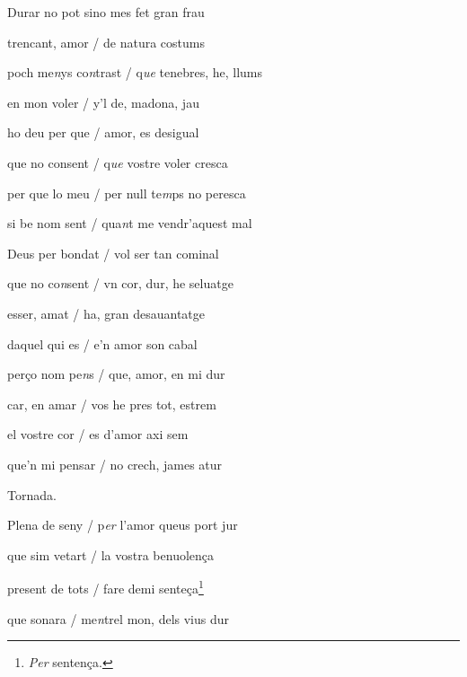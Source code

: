 \documentclass[12pt]{article}
\begin{document}
\begin{estrofa}

 Durar no pot sino mes fet gran frau

 trencant, amor / de natura costums

 poch me\textit{n}ys co\textit{n}trast / q\textit{ue} tenebres, he, llums

 en mon voler / y'l de, madona, jau

 ho deu per que / amor, es desigual

 que no consent / q\textit{ue} vostre voler cresca

 per que lo meu / per null te\textit{m}ps no peresca

 si be nom sent / qua\textit{n}t me vendr'aquest mal

\end{estrofa}



\begin{estrofa}

 Deus per bondat / vol ser tan cominal

 que no co\textit{n}sent / vn cor, dur, he seluatge

 esser, amat / ha, gran desauantatge

 daquel qui es / e'n amor son cabal

 per\c{c}o nom pe\textit{n}s / que, amor, en mi dur

 car, en amar / vos he pres tot, estrem

 el vostre cor / es d'amor axi sem \cite{ref12}

 que'n mi pensar / no crech, james atur

\end{estrofa}


\begin{estrofaExtra}%




\begin{tornada}

Tornada.

\end{tornada}


\end{estrofaExtra}


\begin{estrofa}

 Plena de seny / p\textit{er} l'amor queus port jur

 que sim vetart / la vostra benuolen\c{c}a

 present de tots / fare demi sente\c{c}a\footnote{\textit{Per} senten\c{c}a.}

 que sonara / me\textit{n}trel mon, dels vius dur

\end{estrofa}
\end{document}
